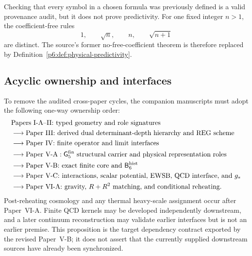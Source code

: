 \documentclass[12pt,a4paper]{article}
\newcommand{\BridgeRaw}{\mathsf B_6^{\rm hist}}
\newcommand{\Gfive}{\mathsf G_5^{\rm fin}}
\begin{document}
\begin{corollary}
\label{p6:cor:no-free-coefficient-status}
Checking that every symbol in a chosen formula was previously defined is a
valid provenance audit, but it does not prove predictivity.  For one fixed
integer \(n>1\), the coefficient-free rules
\[
1,\qquad\sqrt n,\qquad n,\qquad\sqrt{n+1}
\]
are distinct.  The source's former no-free-coefficient theorem is therefore
replaced by Definition~\ref{p6:def:physical-predictivity}.
\end{corollary}

\subsection{Acyclic ownership and interfaces}
\label{p6:sec:ownership}

\begin{proposition}
\label{p6:thm:acyclic-ownership}
To remove the audited cross-paper cycles, the companion manuscripts must
adopt the following one-way ownership order:
\[
\begin{aligned}
&\text{Papers I-A--II: typed geometry and role signatures}\\
&\longrightarrow
\text{Paper III: derived dual determinant-depth hierarchy and REG scheme}\\
&\longrightarrow
\text{Paper IV: finite operator and limit interfaces}\\
&\longrightarrow
\text{Paper V-A}:\Gfive\text{ structural carrier and physical representation roles}\\
&\longrightarrow
\text{Paper V-B: exact finite core and }\BridgeRaw\\
&\longrightarrow
\text{Paper V-C: interactions, scalar potential, EWSB, QCD interface,
and }g_*\\
&\longrightarrow
\text{Paper VI-A: gravity, }R+R^2\text{ matching, and conditional reheating}.
\end{aligned}
\]
Post-reheating cosmology and any thermal heavy-scale assignment occur after
Paper~VI-A.  Finite QCD kernels may be developed independently downstream,
and a later continuum reconstruction may validate earlier interfaces but is
not an earlier premise.  This proposition is the target dependency contract
exported by the revised Paper~V-B; it does not assert that the currently
supplied downstream sources have already been synchronized.
\end{proposition}
\end{document}

